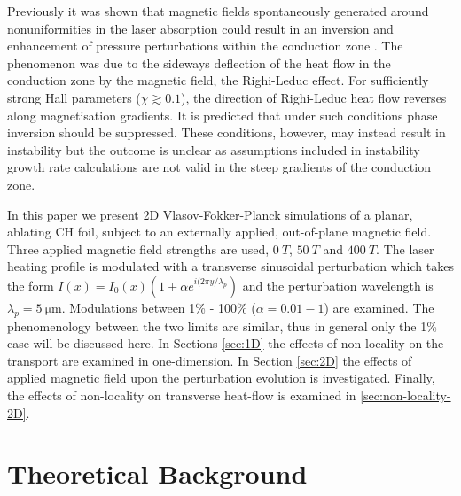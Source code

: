 \documentclass[aip,reprint]{revtex4-1}
\begin{document}
Previously it was shown that magnetic fields spontaneously generated around nonuniformities in the laser absorption could result in an inversion and enhancement of pressure perturbations  within the conduction zone \cite{Hill2018}. The phenomenon was due to the sideways deflection of the heat flow in the conduction zone by the magnetic field, the Righi-Leduc effect. For sufficiently strong Hall parameters ($\chi \gtrsim 0.1$), the direction of Righi-Leduc heat flow reverses along magnetisation gradients. It is predicted that under such conditions phase inversion should be suppressed. These conditions, however, may instead result in instability \cite{Fruchtman1992,Bissell2010a} but the outcome is unclear as assumptions included in instability growth rate calculations are not valid in the steep gradients of the conduction zone.


In this paper we present 2D Vlasov-Fokker-Planck simulations of a planar, ablating CH foil, subject to an externally applied, out-of-plane magnetic field.  Three applied magnetic field strengths are used, $\SI{0}{T}$, $\SI{50}{T}$ and $\SI{400}{T}$. The laser heating profile is modulated with a transverse sinusoidal perturbation which takes the form $I(x) = I_0(x)(1 + \alpha e^{i(2\pi y/\lambda_p})$ and the perturbation wavelength is $\lambda_p = \SI{5}{\micro\meter}$. Modulations between 1\% - 100\% ($\alpha = 0.01-1$) are examined. The phenomenology between the two limits are similar, thus in general only the 1\% case will be discussed here.  In Sections \ref{sec:1D} the effects of non-locality on the transport are examined in one-dimension. In Section \ref{sec:2D} the effects of applied magnetic field upon the perturbation evolution is investigated. Finally, the effects of non-locality on transverse heat-flow is examined in \ref{sec:non-locality-2D}.

\section{Theoretical Background}

\end{document}
